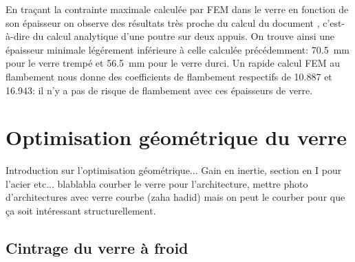 \documentclass[11pt,titlepage]{article}
\begin{document}
En traçant la contrainte maximale calculée par \acrshort{FEM} dans le verre en fonction de son épaisseur on observe des résultats très proche du calcul du document \Textcite{fdp78}, c'est-à-dire du calcul analytique d'une poutre sur deux appuis. On trouve ainsi une épaisseur minimale légérement inférieure à celle calculée précédemment: \qty{70.5}{\milli\meter} pour le verre trempé et \qty{56.5}{\milli\meter} pour le verre durci. Un rapide calcul \acrshort{FEM} au flambement nous donne des coefficients de flambement respectifs de 10.887 et 16.943: il n'y a pas de risque de flambement avec ces épaisseurs de verre. 
\newpage

\section{Optimisation géométrique du verre}

Introduction sur l'optimisation géométrique... Gain en inertie, section en I pour l'acier etc...
blablabla courber le verre pour l'architecture, mettre photo d'architectures avec verre courbe (zaha hadid)
mais on peut le courber pour que ça soit intéressant structurellement.

\newpage
\subsection{Cintrage du verre à froid}
\end{document}
